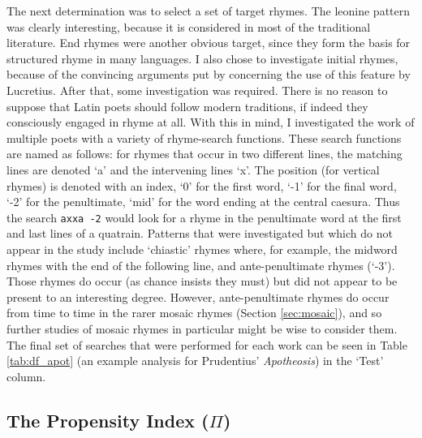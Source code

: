 \documentclass[twocolumn, switch, a4paper]{article} %
\begin{document}
The next determination was to select a set of target rhymes. The leonine
pattern was clearly interesting, because it is considered in most of the
traditional literature. End rhymes were another obvious target, since they
form the basis for structured rhyme in many languages. I also chose to
investigate initial rhymes, because of the convincing arguments put by
 concerning the use of this feature by Lucretius.
After that, some investigation was required. There is no reason to suppose
that Latin poets should follow modern traditions, if indeed they consciously
engaged in rhyme at all. With this in mind, I investigated the work of
multiple poets with a variety of rhyme-search functions. These search
functions are named as follows: for rhymes that occur in two different lines,
the matching lines are denoted `a' and the intervening lines `x'. The position
(for vertical rhymes) is denoted with an index, `0' for the first word, `-1'
for the final word, `-2' for the penultimate, `mid' for the word ending at the
central caesura. Thus the search \texttt{axxa -2} would look for a rhyme in
the penultimate word at the first and last lines of a quatrain. Patterns that
were investigated but which do not appear in the study include `chiastic'
rhymes where, for example, the midword rhymes with the end of the following
line, and ante-penultimate rhymes (`-3'). Those rhymes do occur (as chance
insists they must) but did not appear to be present to an interesting degree.
However, ante-penultimate rhymes do occur from time to time in the rarer mosaic
rhymes (Section \ref{sec:mosaic}), and so further studies of mosaic rhymes in
particular might be wise to consider them. The final set of searches that were
performed for each work can be seen in Table \ref{tab:df_apot} (an example
analysis for Prudentius' \emph{Apotheosis}) in the `Test' column.

\subsection{The Propensity Index (\texorpdfstring{$\Pi$}{PI})}
\end{document}
